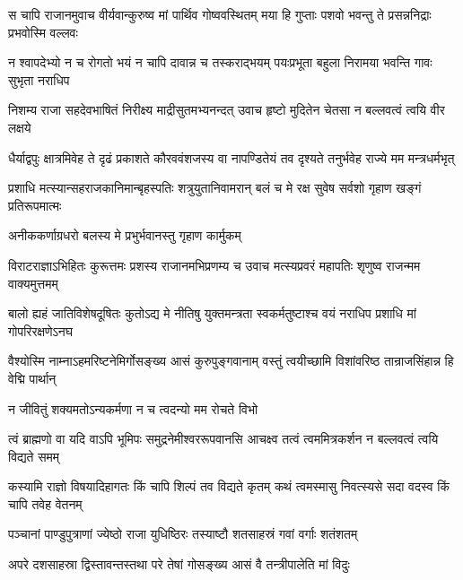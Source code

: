 \twolineshloka
{स चापि राजानमुवाच वीर्यवान्कुरुष्व मां पार्थिव गोष्ववस्थितम्}
{मया हि गुप्ताः पशवो भवन्तु ते प्रसन्ननिद्राः प्रभवोस्मि वल्लवः}


\twolineshloka
{न श्वापदेभ्यो न च रोगतो भयं न चापि दावान्न च तस्कराद्भयम्}
{पयःप्रभूता बहुला निरामया भवन्ति गावः सुभृता नराधिप}


\twolineshloka
{निशम्य राजा सहदेवभाषितं निरीक्ष्य माद्रीसुतमभ्यनन्दत्}
{उवाच हृष्टो मुदितेन चेतसा न बल्लवत्वं त्वयि वीर लक्षये}





\twolineshloka
{धैर्याद्वपुः क्षात्रमिवेह ते दृढं प्रकाशते कौरववंशजस्य वा}
{नापण्डितेयं तव दृश्यते तनुर्भवेह राज्ये मम मन्त्रधर्मभृत्}


\twolineshloka
{प्रशाधि मत्स्यान्सहराजकानिमान्बृहस्पतिः शत्रुयुतानिवामरान्}
{बलं च मे रक्ष सुवेष सर्वशो गृहाण खङ्गं प्रतिरूपमात्मः}


\onelineshloka
{अनीककर्णाग्रधरो बलस्य मे प्रभुर्भवानस्तु गृहाण कार्मुकम्}


\twolineshloka
{विराटराज्ञाऽभिहितः कुरूत्तमः प्रशस्य राजानमभिप्रणम्य च}
{उवाच मत्स्यप्रवरं महापतिः शृणुष्व राजन्मम वाक्यमुत्तमम्}


\twolineshloka
{बालो ह्यहं जातिविशेषदूषितः कुतोऽद्य मे नीतिषु युक्तमन्त्रता}
{स्वकर्मतुष्टाश्च वयं नराधिप प्रशाधि मां गोपरिरक्षणेऽनघ}


\twolineshloka
{वैश्योस्मि नाम्नाऽहमरिष्टनेमिर्गोसङ्ख्य आसं कुरुपुङ्गवानाम्}
{वस्तुं त्वयीच्छामि विशांवरिष्ठ तान्राजसिंहान्न हि वेद्मि पार्थान्}


\twolineshloka
{न जीवितुं शक्यमतोऽन्यकर्मणा}
{न च त्वदन्यो मम रोचते विभो}




\twolineshloka
{त्वं ब्राह्मणो वा यदि वाऽपि भूमिपः समुद्रनेमीश्वररूपवानसि}
{आचक्ष्व तत्वं त्वममित्रकर्शन न बल्लवत्वं त्वयि विद्यते समम्}


\twolineshloka
{कस्यामि राज्ञो विषयादिहागतः किं चापि शिल्पं तव विद्यते कृतम्}
{कथं त्वमस्मासु निवत्स्यसे सदा वदस्व किं चापि तवेह वेतनम्}




\twolineshloka
{पञ्चानां पाण्डुपुत्राणां ज्येष्ठो राजा युधिष्ठिरः}
{तस्याष्टौ शतसाहस्रं गवां वर्गाः शतंशतम्}


\twolineshloka
{अपरे दशसाहस्रा द्विस्तावन्तस्तथा परे}
{तेषां गोसङ्ख्य आसं वै तन्त्रीपालेति मां विदुः}


